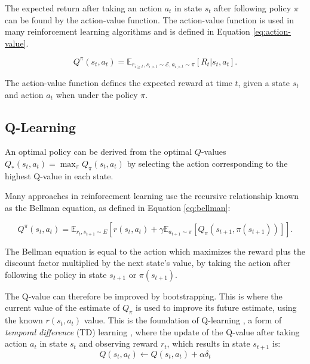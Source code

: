 \documentclass[conference]{IEEEtran}
\begin{document}
The expected return after taking an action $a_t$ in state $s_t$ after following policy $\pi$ can be found by the action-value function. The action-value function is used in many reinforcement learning algorithms and is defined in Equation \ref{eq:action-value}.

\begin{equation}
	\label{eq:action-value}
	Q^{\pi}(s_t,a_t)=\mathbb{E}_{r_{i\geq t},s_{i>t}\sim \mathcal{E},a_{i>t}\sim\pi}[R_t|s_t,a_t].
\end{equation}

\noindent The action-value function defines the expected reward at time $t$, given a state $s_t$ and action $a_t$ when under the policy $\pi$.

\subsection{Q-Learning}

 An optimal policy can be derived from the optimal $Q$-values $Q_*(s_t,a_t)=\max_\pi Q_\pi(s_t,a_t)$ by selecting the action corresponding to the highest Q-value in each state.

Many approaches in reinforcement learning use the recursive relationship known as the Bellman equation, as defined in Equation \ref{eq:bellman}:

\begin{dmath}
	\label{eq:bellman}
	Q^\pi(s_t,a_t)=\mathbb{E}_{{r_t},s_{t+1}\sim E} [r(s_t,a_t)+
	\gamma\mathbb{E}_{a_{t+1}\sim \pi}[Q_\pi(s_{t+1},\pi(s_{t+1}))]].
\end{dmath}

\noindent The Bellman equation is equal to the action which maximizes the reward plus the discount factor multiplied by the next state's value, by taking the action after following the policy in state $s_{t+1}$ or $\pi(s_{t+1})$.

The Q-value can therefore be improved by bootstrapping. This is where the current value of the estimate of $Q_\pi$ is used to improve its future estimate, using the known $r(s_t,a_t)$ value. This is the foundation of Q-learning \cite{Gay2007}, a form of \textit{temporal difference} (TD) learning \cite{Sutton2015}, where the update of the Q-value after taking action $a_t$ in state $s_t$ and observing reward $r_t$, which results in state $s_{t+1}$ is:
\begin{equation}
	Q(s_t,a_t)\leftarrow Q(s_t,a_t)+\alpha\delta_t
\end{equation}
\end{document}
